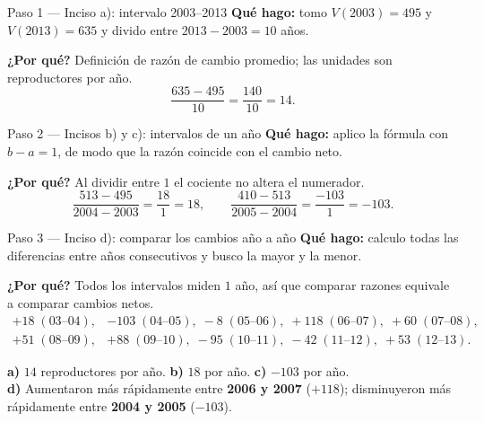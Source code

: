 \documentclass[11pt]{article}
\begin{document}
\begin{paso}{Paso 1 --- Inciso a): intervalo 2003--2013}
\textbf{Qué hago:} tomo $V(2003)=495$ y $V(2013)=635$ y divido entre $2013-2003=10$ años.

\textbf{¿Por qué?} Definición de razón de cambio promedio; las unidades son reproductores por año.
\[
\frac{635-495}{10}=\frac{140}{10}=14.
\]
\end{paso}

\begin{paso}{Paso 2 --- Incisos b) y c): intervalos de un año}
\textbf{Qué hago:} aplico la fórmula con $b-a=1$, de modo que la razón coincide con el cambio neto.

\textbf{¿Por qué?} Al dividir entre $1$ el cociente no altera el numerador.
\[
\frac{513-495}{2004-2003}=\frac{18}{1}=18,\qquad
\frac{410-513}{2005-2004}=\frac{-103}{1}=-103.
\]
\end{paso}

\begin{paso}{Paso 3 --- Inciso d): comparar los cambios año a año}
\textbf{Qué hago:} calculo todas las diferencias entre años consecutivos y busco la mayor y la menor.

\textbf{¿Por qué?} Todos los intervalos miden $1$ año, así que comparar razones equivale a comparar cambios netos.
\[
\begin{array}{ll}
+18\;(03\text{--}04), & -103\;(04\text{--}05),\; -8\;(05\text{--}06),\; +118\;(06\text{--}07),\; +60\;(07\text{--}08),\\
+51\;(08\text{--}09), & +88\;(09\text{--}10),\; -95\;(10\text{--}11),\; -42\;(11\text{--}12),\; +53\;(12\text{--}13).
\end{array}
\]
\end{paso}

\begin{resp}
\textbf{a)} $14$ reproductores por año. \quad \textbf{b)} $18$ por año. \quad \textbf{c)} $-103$ por año.\\
\textbf{d)} Aumentaron más rápidamente entre \textbf{2006 y 2007} ($+118$); disminuyeron más rápidamente entre \textbf{2004 y 2005} ($-103$).
\end{resp}
\end{document}
